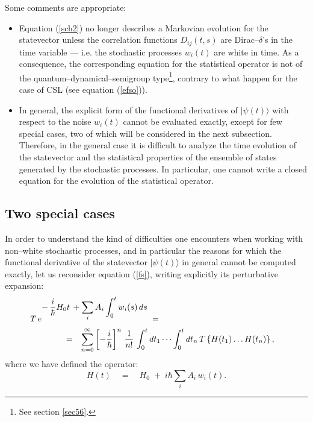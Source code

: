 \documentclass[12pt]{article}
\begin{document}
Some comments are appropriate:
\begin{itemize}
\item Equation (\ref{sch2}) no longer describes a Markovian
evolution for the sta\-te\-vector unless the correlation functions
$D_{ij}(t,s)$ are Dirac--$\delta$'s in the time variable --- i.e.
the stochastic processes $w_{i}(t)$ are white in time. As a
consequence, the corresponding equation for the statistical
operator is not of the quantum--dynamical--semigroup
type\footnote{See section \ref{sec56}.}, contrary to what happen
for the case of CSL (see equation (\ref{efso})).

\item In general,  the explicit form of the functional derivatives
of $|\psi(t)\rangle$ with respect to the noise $w_{i}(t)$ cannot
be evaluated exactly, except for few special cases, two of which
will be considered in the next subsection. Therefore, in the
general case it is difficult to analyze the time evolution of the
statevector and the statistical properties of the ensemble of
states generated by the stochastic processes. In particular, one
cannot write a closed equation for the evolution of the
statistical operator.
\end{itemize}


\subsection{Two special cases} \label{nsec2}

In order to understand the kind of difficulties one encounters
when working with non--white stochastic processes, and in
particular the reasons for which the functional derivative of the
statevector $|\psi(t)\rangle$ in general cannot be computed
exactly, let us reconsider equation (\ref{fs}), writing explicitly
its perturbative expansion:
\begin{eqnarray} \label{fs2}
\lefteqn{ T\, e^{\displaystyle -\, \frac{i}{\hbar}H_{0}t\, +
\sum_{i} A_{i} \int_{0}^{t} w_{i}(s)\, ds } \; =} \qquad\qquad
\nonumber \\
& = & \sum_{n = 0}^{\infty} \left[-\frac{i}{\hbar}\right]^{n}\,
\frac{1}{n!} \, \int_{0}^{t} dt_{1} \cdots \int_{0}^{t} dt_{n}\,
T\left\{H(t_{1}) \ldots H(t_{n}) \right\}, \quad
\end{eqnarray}
where we have defined the operator:
\begin{equation} \label{yhj}
H(t) \quad = \quad H_{0} \; + \; i\hbar\sum_{i}A_{i}\,w_{i}(t).
\end{equation}
\end{document}
